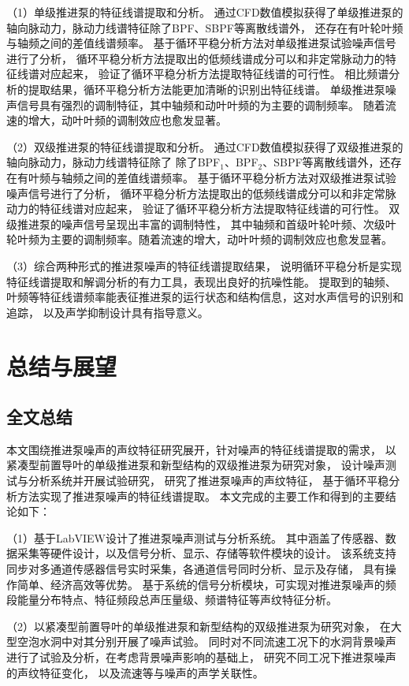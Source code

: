 （1）单级推进泵的特征线谱提取和分析。
通过CFD数值模拟获得了单级推进泵的轴向脉动力，脉动力线谱特征除了BPF、SBPF等离散线谱外，
还存在有叶轮叶频与轴频之间的差值线谱频率。
基于循环平稳分析方法对单级推进泵试验噪声信号进行了分析，
循环平稳分析方法提取出的低频线谱成分可以和非定常脉动力的特征线谱对应起来，
验证了循环平稳分析方法提取特征线谱的可行性。
相比频谱分析的提取结果，循环平稳分析方法能更加清晰的识别出特征线谱。
单级推进泵噪声信号具有强烈的调制特征，其中轴频和动叶叶频的为主要的调制频率。
随着流速的增大，动叶叶频的调制效应也愈发显著。

（2）双级推进泵的特征线谱提取和分析。
通过CFD数值模拟获得了双级推进泵的轴向脉动力，脉动力线谱特征除了
除了BPF$_1$、BPF$_2$、SBPF等离散线谱外，还存在有叶频与轴频之间的差值线谱频率。
基于循环平稳分析方法对双级推进泵试验噪声信号进行了分析，
循环平稳分析方法提取出的低频线谱成分可以和非定常脉动力的特征线谱对应起来，
验证了循环平稳分析方法提取特征线谱的可行性。
双级推进泵的噪声信号呈现出丰富的调制特性，
其中轴频和首级叶轮叶频、次级叶轮叶频为主要的调制频率。随着流速的增大，动叶叶频的调制效应也愈发显著。

（3）综合两种形式的推进泵噪声的特征线谱提取结果，
说明循环平稳分析是实现特征线谱提取和解调分析的有力工具，表现出良好的抗噪性能。
提取到的轴频、叶频等特征线谱频率能表征推进泵的运行状态和结构信息，这对水声信号的识别和追踪，
以及声学抑制设计具有指导意义。


\chapter{总结与展望}
\section{全文总结}
本文围绕推进泵噪声的声纹特征研究展开，针对噪声的特征线谱提取的需求，
以紧凑型前置导叶的单级推进泵和新型结构的双级推进泵为研究对象，
设计噪声测试与分析系统并开展试验研究，
研究了推进泵噪声的声纹特征，
基于循环平稳分析方法实现了推进泵噪声的特征线谱提取。
本文完成的主要工作和得到的主要结论如下：

（1）基于LabVIEW设计了推进泵噪声测试与分析系统。
其中涵盖了传感器、数据采集等硬件设计，以及信号分析、显示、存储等软件模块的设计。
该系统支持同步对多通道传感器信号实时采集，各通道信号同时分析、显示及存储，
具有操作简单、经济高效等优势。
基于系统的信号分析模块，可实现对推进泵噪声的频段能量分布特点、特征频段总声压量级、频谱特征等声纹特征分析。

（2）以紧凑型前置导叶的单级推进泵和新型结构的双级推进泵为研究对象，
在大型空泡水洞中对其分别开展了噪声试验。
同时对不同流速工况下的水洞背景噪声进行了试验及分析，在考虑背景噪声影响的基础上，
研究不同工况下推进泵噪声的声纹特征变化，
以及流速等与噪声的声学关联性。

